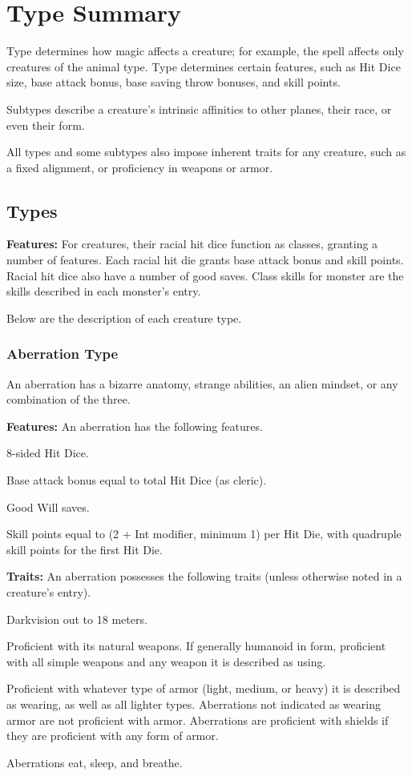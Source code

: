 \section{Type Summary}
Type determines how magic affects a creature; for example, the  spell affects only creatures of the animal type. Type determines certain features, such as Hit Dice size, base attack bonus, base saving throw bonuses, and skill points.

Subtypes describe a creature's intrinsic affinities to other planes, their race, or even their form.

All types and some subtypes also impose inherent traits for any creature, such as a fixed alignment, or proficiency in weapons or armor.

\subsection{Types}
\textbf{Features:} For creatures, their racial hit dice function as classes, granting a number of features. Each racial hit die grants base attack bonus and skill points. Racial hit dice also have a number of good saves. Class skills for monster are the skills described in each monster's entry.

Below are the description of each creature type.

\subsubsection{Aberration Type}
An aberration has a bizarre anatomy, strange abilities, an alien mindset, or any combination of the three.

\textbf{Features:} An aberration has the following features.
\begin{itemize*}
\item 8-sided Hit Dice.
\item Base attack bonus equal to \threequarters total Hit Dice (as cleric).
\item Good Will saves.
\item Skill points equal to (2 + Int modifier, minimum 1) per Hit Die, with quadruple skill points for the first Hit Die.
\end{itemize*}

\textbf{Traits:} An aberration possesses the following traits (unless otherwise noted in a creature's entry).
\begin{itemize*}
\item Darkvision out to 18 meters.
\item Proficient with its natural weapons. If generally humanoid in form, proficient with all simple weapons and any weapon it is described as using.
\item Proficient with whatever type of armor (light, medium, or heavy) it is described as wearing, as well as all lighter types. Aberrations not indicated as wearing armor are not proficient with armor. Aberrations are proficient with shields if they are proficient with any form of armor.
\item Aberrations eat, sleep, and breathe.
\end{itemize*}

